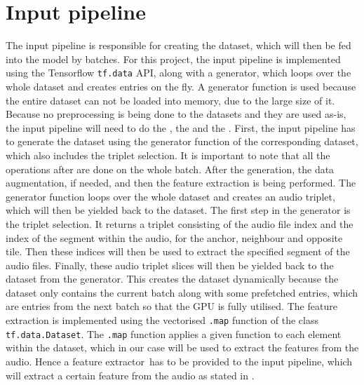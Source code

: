 \section{Input pipeline}
\label{sec:Input-Pipeline}
The input pipeline is responsible for creating the dataset, which will then be fed into the model by batches. For this project, the input pipeline is implemented using the Tensorflow \texttt{tf.data} API\footnotemark, along with a generator, which loops over the whole dataset and creates entries on the fly. A generator function is used because the entire dataset can not be loaded into memory, due to the large size of it.
\newline
\newline
Because no preprocessing is being done to the datasets and they are used as-is, the input pipeline will need to do the , the  and the .
\newline
First, the input pipeline has to generate the dataset using the generator function of the corresponding dataset, which also includes the triplet selection. It is important to note that all the operations after are done on the whole batch. After the generation, the data augmentation, if needed, and then the feature extraction is being performed.
\newline
\newline
The generator function loops over the whole dataset and creates an audio triplet, which will then be yielded back to the dataset. The first step in the generator is the triplet selection. It returns a triplet consisting of the audio file index and the index of the segment within the audio, for the anchor, neighbour and opposite tile. Then these indices will then be used to extract the specified segment of the audio files. Finally, these audio triplet slices will then be yielded back to the dataset from the generator.
\newline
\newline
This creates the dataset dynamically because the dataset only contains the current batch along with some prefetched entries, which are entries from the next batch so that the \gls{GPU} is fully utilised.
\newline
\newline
The feature extraction is implemented using the vectorised \texttt{.map} function of the class \texttt{tf.data.Dataset}\footnotemark. The \texttt{.map} function applies a given function to each element within the dataset, which in our case will be used to extract the features from the audio. Hence a \flqq feature extractor\frqq \ has to be provided to the input pipeline, which will extract a certain feature from the audio as stated in .

